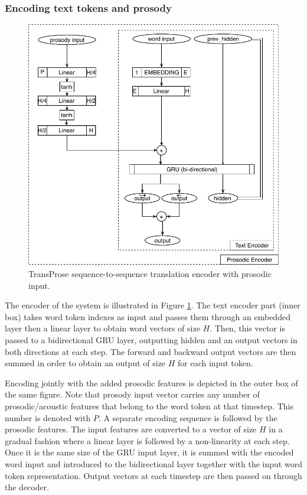 \subsubsection{Encoding text tokens and prosody}

\begin{figure}
\centering
\includegraphics[width=0.7\linewidth]{img/TransProse_Encoder.pdf}
\caption{TransProse sequence-to-sequence translation encoder with prosodic input.}
\label{figure:transprose_encoder}
\end{figure}

The encoder of the system is illustrated in Figure \ref{figure:transprose_encoder}. The text encoder part (inner box) takes word token indexes as input and passes them through an embedded layer then a linear layer to obtain word vectors of size $H$. Then, this vector is passed to a bidirectional GRU layer, outputting hidden and an output vectors in both directions at each step. The forward and backward output vectors are then summed in order to obtain an output of size $H$ for each input token. 

Encoding jointly with the added prosodic features is depicted in the outer box of the same figure. Note that prosody input vector carries any number of prosodic/acoustic features that belong to the word token at that timestep. This number is denoted with $P$. A separate encoding sequence is followed by the prosodic features. The input features are converted to a vector of size $H$ in a gradual fashion where a linear layer is followed by a non-linearity at each step. Once it is the same size of the GRU input layer, it is summed with the encoded word input and introduced to the bidirectional layer together with the input word token representation. Output vectors at each timestep are then passed on through the decoder. 

